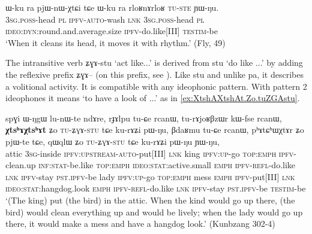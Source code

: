 \documentclass[oldfontcommands,oneside,a4paper,11pt]{article}
\newcommand{\ipa}[1]{{\phon \mbox{#1}}} %
\begin{document}
\begin{exe}
\ex \label{ex:rloR.nA.rloR}
\gll
\ipa{ɯ-ku} 	\ipa{ra} 	\ipa{pjɯ-nɯ-χtɕi} 	\ipa{tɕe} 	\ipa{ɯ-ku} 	\ipa{ra} 	\ipa{rloʁnɤrloʁ} 	\textsc{\ipa{tu-ste}} 	\ipa{ɲɯ-ŋu.} \\
\textsc{3sg.poss}-head \textsc{pl} \textsc{ipfv-auto}-wash \textsc{lnk} \textsc{3sg.poss}-head \textsc{pl}  \textsc{ideo:dyn}:round.and.average.size \textsc{ipfv}-do.like[III] \textsc{testim}-be \\ 
\glt `When it cleans its head, it moves it with rhythm.' (Fly, 49)
\end{exe}

The intransitive verb  \ipa{ʑɣɤ-stu} `act like...' is derived from \ipa{stu} `do like ...' by adding the reflexive prefix \ipa{ʑɣɤ--} (on this prefix, see \citealt{jacques10refl}). Like \ipa{stu} and unlike \ipa{pa}, it describes a volitional activity. It is compatible with any ideophonic pattern. With pattern 2 ideophones it means `to have a look of ...' as in \ref{ex:XtshAXtshAt.Zo.tuZGAstu}.

\begin{exe}
\ex \label{ex:XtshAXtshAt.Zo.tuZGAstu}
\gll
\ipa{spɣi} 	\ipa{ɯ-ŋgɯ} 	\ipa{lu-nɯ-te} 	\ipa{ndɤre,} 	 	\ipa{rɟɤlpu} 	\ipa{tu-ɕe} 	\ipa{rcanɯ,} 	\ipa{tu-rɤjoʁβzɯr} 	\ipa{kɯ-fse} 	\ipa{rcanɯ,} 	\ipa{\textbf{χtsʰɤχtsʰɤt}} 	\ipa{ʑo} 	\textsc{\ipa{tu-ʑɣɤ-stu}} 	\ipa{tɕe} 	\ipa{ku-rɤʑi} 	\ipa{pɯ-ŋu,} 	\ipa{βdaʁmu} 	\ipa{tu-ɕe} 	\ipa{rcanɯ,} 	\ipa{pʰɤtɕʰɯχtɤr} 	\ipa{ʑo} 	\ipa{pjɯ-te} 	\ipa{tɕe,} 	\ipa{qɯqlɯ} 	\ipa{ʑo} 	\textsc{\ipa{tu-ʑɣɤ-stu} }	\ipa{tɕe} 	\ipa{ku-rɤʑi} 	\ipa{pɯ-ŋu} 	\ipa{ɲɯ-ŋu,} 	\\
attic \textsc{3sg}-inside \textsc{ipfv:upstream-auto}-put[III] \textsc{lnk} king  \textsc{ipfv:up}-go \textsc{top:emph} \textsc{ipfv}-clean.up \textsc{inf:stat}-be.like  \textsc{top:emph} \textsc{ideo:stat}:active.small \textsc{emph} \textsc{ipfv-refl}-do.like \textsc{lnk} \textsc{ipfv}-stay \textsc{pst.ipfv}-be  lady  \textsc{ipfv:up}-go \textsc{top:emph} mess \textsc{emph} \textsc{ipfv}-put[III] \textsc{lnk} \textsc{ideo:stat}:hangdog.look \textsc{emph} \textsc{ipfv-refl}-do.like \textsc{lnk} \textsc{ipfv}-stay \textsc{pst.ipfv}-be \textsc{testim}-be \\
\glt `(The king) put (the bird) in the attic. When the kind would go up there, (the bird) would clean everything up and would be lively; when the lady would go up there, it would make a mess and have a hangdog look.' (Kunbzang 302-4)
\end{exe}
\end{document}
